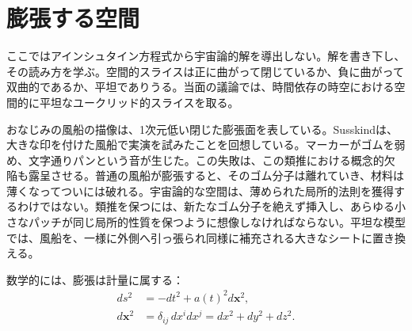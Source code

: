 \begin{classroomqa}
\end{classroomqa}

\begin{classroomqa}
\end{classroomqa}

\section{膨張する空間}

ここではアインシュタイン方程式から宇宙論的解を導出しない。解を書き下し、その読み方を学ぶ。空間的スライスは正に曲がって閉じているか、負に曲がって双曲的であるか、平坦でありうる。当面の議論では、時間依存の時空における空間的に平坦なユークリッド的スライスを取る。

\begin{classroomqa}
\end{classroomqa}

おなじみの風船の描像は、1次元低い閉じた膨張面を表している。Susskindは、大きな印を付けた風船で実演を試みたことを回想している。マーカーがゴムを弱め、文字通りパンという音が生じた。この失敗は、この類推における概念的欠陥も露呈させる。普通の風船が膨張すると、そのゴム分子は離れていき、材料は薄くなってついには破れる。宇宙論的な空間は、薄められた局所的法則を獲得するわけではない。類推を保つには、新たなゴム分子を絶えず挿入し、あらゆる小さなパッチが同じ局所的性質を保つように想像しなければならない。平坦な模型では、風船を、一様に外側へ引っ張られ同様に補充される大きなシートに置き換える。

数学的には、膨張は計量に属する：
\begin{equation}
\begin{aligned}
ds^2&=-dt^2+a(t)^2d\mathbf{x}^2,\\
d\mathbf{x}^2&=\delta_{ij}\,dx^i dx^j
=dx^2+dy^2+dz^2.
\end{aligned}
\label{eq:l07-frw-metric}
\end{equation}

